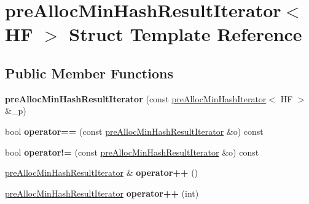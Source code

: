 \hypertarget{structpreAllocMinHashResultIterator}{}\section{pre\+Alloc\+Min\+Hash\+Result\+Iterator$<$ HF $>$ Struct Template Reference}
\label{structpreAllocMinHashResultIterator}
\subsection*{Public Member Functions}
\begin{DoxyCompactItemize}
\item 
\mbox{\label{structpreAllocMinHashResultIterator_a6a872da52051ac180917eeddf10cecb8}} 
{\bfseries pre\+Alloc\+Min\+Hash\+Result\+Iterator} (const \hyperlink{classpreAllocMinHashIterator}{pre\+Alloc\+Min\+Hash\+Iterator}$<$ HF $>$ \&\+\_\+p)
\item 
\mbox{\label{structpreAllocMinHashResultIterator_a1d068e080cd74decc4d87317c81e4c19}} 
bool {\bfseries operator==} (const \hyperlink{structpreAllocMinHashResultIterator}{pre\+Alloc\+Min\+Hash\+Result\+Iterator} \&o) const
\item 
\mbox{\label{structpreAllocMinHashResultIterator_a341ed5661a1c58fce28acc0c9ed65e9b}} 
bool {\bfseries operator!=} (const \hyperlink{structpreAllocMinHashResultIterator}{pre\+Alloc\+Min\+Hash\+Result\+Iterator} \&o) const
\item 
\mbox{\label{structpreAllocMinHashResultIterator_a7c5cc490302b3647a970f9634087319e}} 
\hyperlink{structpreAllocMinHashResultIterator}{pre\+Alloc\+Min\+Hash\+Result\+Iterator} \& {\bfseries operator++} ()
\item 
\mbox{\label{structpreAllocMinHashResultIterator_a5ba8dd91314eeae41c4bbdbcbfcc2277}} 
\hyperlink{structpreAllocMinHashResultIterator}{pre\+Alloc\+Min\+Hash\+Result\+Iterator} {\bfseries operator++} (int)
\item 
\mbox{\label{structpreAllocMinHashResultIterator_af00ac4be99ddd55bb8d5fe86d2b4f41f}} 

\end{DoxyCompactItemize}
